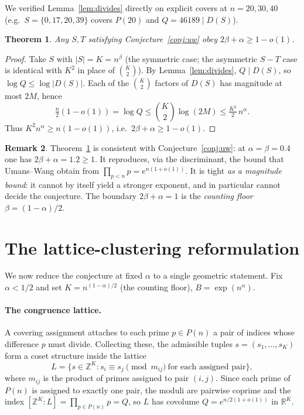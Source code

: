 \documentclass[11pt]{article}
\newtheorem{theorem}{Theorem}
\theoremstyle{definition}
\newtheorem{remark}[theorem]{Remark}
\newcommand{\Z}{\mathbb{Z}}
\newcommand{\R}{\mathbb{R}}
\begin{document}
We verified Lemma~\ref{lem:divides} directly on explicit covers at $n=20,30,40$
(e.g.\ $S=\{0,17,20,39\}$ covers $P(20)$ and $Q=46189\mid D(S)$).

\begin{theorem}\label{thm:lb}
Any $S,T$ satisfying Conjecture~\ref{conj:uw} obey $2\beta+\alpha\ge 1-o(1)$.
\end{theorem}
\begin{proof}
Take $S$ with $|S|=K=n^{\beta}$ (the symmetric case; the asymmetric $S-T$ case is
identical with $K^2$ in place of $\binom{K}{2}$). By Lemma~\ref{lem:divides},
$Q\mid D(S)$, so $\log Q\le \log|D(S)|$. Each of the $\binom{K}{2}$ factors of
$D(S)$ has magnitude at most $2M$, hence
\[
\tfrac{n}{2}(1-o(1))=\log Q\le \binom{K}{2}\log(2M)\le \tfrac{K^2}{2}\,n^{\alpha}.
\]
Thus $K^2 n^{\alpha}\ge n(1-o(1))$, i.e.\ $2\beta+\alpha\ge 1-o(1)$.
\end{proof}

\begin{remark}
Theorem~\ref{thm:lb} is consistent with Conjecture~\ref{conj:uw}: at
$\alpha=\beta=0.4$ one has $2\beta+\alpha=1.2\ge 1$. It reproduces, via the
discriminant, the bound that Umans--Wang obtain from
$\prod_{p<n}p=e^{n(1+o(1))}$. It is tight \emph{as a magnitude bound}: it cannot by
itself yield a stronger exponent, and in particular cannot decide the conjecture.
The boundary $2\beta+\alpha=1$ is the \emph{counting floor}
$\beta=(1-\alpha)/2$.
\end{remark}

\section{The lattice-clustering reformulation}

We now reduce the conjecture at fixed $\alpha$ to a single geometric statement. Fix
$\alpha<1/2$ and set $K=n^{(1-\alpha)/2}$ (the counting floor), $B=\exp(n^{\alpha})$.

\paragraph{The congruence lattice.}
A covering assignment attaches to each prime $p\in P(n)$ a pair of indices whose
difference $p$ must divide. Collecting these, the admissible tuples
$s=(s_1,\dots,s_K)$ form a coset structure inside the lattice
\[
L=\{s\in\Z^{K}: s_i\equiv s_j \pmod{m_{ij}}\ \text{for each assigned pair}\},
\]
where $m_{ij}$ is the product of primes assigned to pair $(i,j)$. Since each prime
of $P(n)$ is assigned to exactly one pair, the moduli are pairwise coprime and the
index $[\Z^K:L]=\prod_{p\in P(n)}p=Q$, so $L$ has covolume $Q=e^{n/2(1+o(1))}$ in
$\R^K$.
\end{document}
